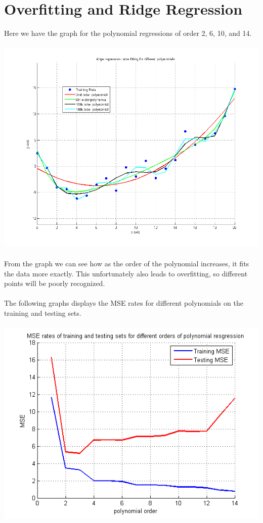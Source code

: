 \documentclass[paper=a4, fontsize=11pt]{scrartcl} %
\numberwithin{equation}{section} %
\numberwithin{figure}{section} %
\numberwithin{table}{section} %
\begin{document}
	\section{Overfitting and Ridge Regression}
	Here we have the graph for the polynomial regressions of order 2, 6, 10, and 14.
	\\\\
	\hspace*{-3cm}\includegraphics[scale=0.8]{4_order_polynomials}
	\\\\
	From the graph we can see how as the order of the polynomial increases, it fits the data more exactly. This unfortunately also leads to overfitting, so different points will be poorly recognized.
	\\\\
	The following graphs displays the MSE rates for different polynomials on the training and testing sets.
	\\\\
	\includegraphics[]{MSE_rates}
\end{document}
